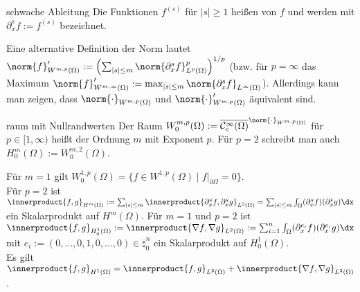 \begin{Def}{schwache Ableitung}
    Die Funktionen $f^{(s)}$ für $|s| \ge 1$ heißen  von $f$
    und werden mit $\partial_x^s f := f^{(s)}$ bezeichnet.
\end{Def}

\begin{Bem}
    Eine alternative Definition der Norm lautet
    $\norm{f}_{W^{m,p}(\Omega)}' :=
    \left(\sum_{|s| \le m} \norm{\partial_x^s f}_{L^p(\Omega)}^p\right)^{1/p}$
    (bzw. für $p = \infty$ das Maximum
    $\norm{f}_{W^{m,\infty}(\Omega)}' :=
    \max_{|s| \le m} \norm{\partial_x^s f}_{L^\infty(\Omega)}$).
    Allerdings kann man zeigen, dass
    $\norm{\cdot}_{W^{m,p}(\Omega)}$ und $\norm{\cdot}_{W^{m,p}(\Omega)}'$ äquivalent sind.
\end{Bem}

\begin{Def}{raum mit Nullrandwerten}
    Der Raum $W_0^{m,p}(\Omega) := \overline{\C^\infty_c(\Omega)}^{\norm{\cdot}_{W^{m,p}(\Omega)}}$
    für\\
    $p \in [1, \infty)$ heißt
    der Ordnung $m$ mit Exponent $p$.
    Für $p = 2$ schreibt man auch $H_0^m(\Omega) := W_0^{m,2}(\Omega)$.
\end{Def}

\begin{Bem}
    Für $m = 1$ gilt $W_0^{1,p}(\Omega) =
    \{f \in W^{1,p}(\Omega) \;|\; f|_{\partial\Omega} = 0\}$.\\
    Für $p = 2$ ist $\innerproduct{f, g}_{H^m(\Omega)}
    := \sum_{|s| \le m} \innerproduct{\partial_x^s f, \partial_x^s g}_{L^2(\Omega)}
    = \sum_{|s| \le m} \int_\Omega (\partial_x^s f) (\partial_x^s g) \dx$
    ein Skalarprodukt auf $H^m(\Omega)$.
    Für $m = 1$ und $p = 2$ ist
    $\innerproduct{f, g}_{H^1_0(\Omega)}
    := \innerproduct{\nabla f, \nabla g}_{L^2(\Omega)}
    := \sum_{i=1}^n \int_\Omega (\partial_x^{e_i} f) (\partial_x^{e_i} g) \dx$
    mit $e_i := (0, \dotsc, 0, 1, 0, \dotsc, 0) \in \natural_0^n$
    ein Skalarprodukt auf $H^1_0(\Omega)$.\\
    Es gilt
    $\innerproduct{f, g}_{H^1(\Omega)}
    = \innerproduct{f, g}_{L^2(\Omega)} + \innerproduct{\nabla f, \nabla g}_{L^2(\Omega)}$.
\end{Bem}

